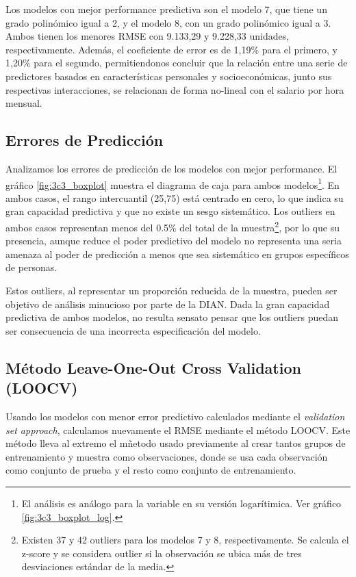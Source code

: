 \documentclass[11pt,oneside]{article}
\begin{document}
	
	Los modelos con mejor performance predictiva son el modelo 7, que tiene un grado polinómico igual a 2, y el modelo 8, con un grado polinómico igual a 3. Ambos tienen los menores RMSE con 9.133,29 y 9.228,33 unidades, respectivamente. Además, el coeficiente de error es de 1,19\% para el primero, y 1,20\% para el segundo, permitiendonos concluir que la relación entre una serie de predictores basados en características personales y socioeconómicas, junto sus respectivas interacciones, se relacionan de forma no-lineal con el salario por hora mensual. 
	
	\subsection{Errores de Predicción}

    Analizamos los errores de predicción de los modelos con mejor performance. El gráfico \ref{fig:3c3_boxplot} muestra el diagrama de caja para ambos modelos\footnote{ El análisis es análogo para la variable en su versión logarítimica. Ver gráfico \ref{fig:3c3_boxplot_log}.}. En ambos casos, el rango intercuantil (25,75) está centrado en cero, lo que indica su gran capacidad predictiva y que no existe un sesgo sistemático. Los outliers en ambos casos representan menos del 0.5\% del total de la muestra\footnote{Existen 37 y 42 outliers para los modelos 7 y 8, respectivamente. Se calcula el z-score y se considera outlier si la observación se ubica más de tres desviaciones estándar de la media.}, por lo que su presencia, aunque reduce el poder predictivo del modelo no representa una seria amenaza al poder de predicción a menos que sea sistemático en grupos específicos de personas.

    Estos outliers, al representar un proporción reducida de la muestra, pueden ser objetivo de análisis minucioso por parte de la DIAN. Dada la gran capacidad predictiva de ambos modelos, no resulta sensato pensar que los outliers puedan ser consecuencia de una incorrecta especificación del modelo.

	\subsection{Método Leave-One-Out Cross Validation (LOOCV)}
	
	Usando los modelos con menor error predictivo calculados mediante el \textit{validation set approach}, calculamos nuevamente el RMSE mediante el método LOOCV. Este método lleva al extremo el mñetodo usado previamente al crear tantos grupos de entrenamiento y muestra como observaciones, donde se usa cada observación como conjunto de prueba y el resto como conjunto de entrenamiento.
\end{document}
